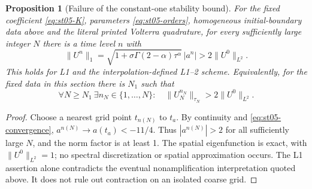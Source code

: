 \documentclass[11pt,a4paper]{amsart}
\theoremstyle{remark}
\theoremstyle{plain}
\newtheorem{proposition}{Proposition}[section]
\theoremstyle{remark}
\numberwithin{equation}{section}
\begin{document}
\begin{proposition}[Failure of the constant-one stability bound]\label{prop:st05}
For the fixed coefficient \eqref{eq:st05-K}, parameters \eqref{eq:st05-orders}, homogeneous initial-boundary data above and the literal printed Volterra quadrature, for every sufficiently large integer $N$ there is a time level $n$ with
\[
 \|U^n\|_1=\sqrt{1+\sigma\Gamma(2-\alpha)\tau^\alpha}\,|a^n|>2\|U^0\|_{L^2}.
\]
This holds for L1 and the interpolation-defined L1--2 scheme. Equivalently, for the fixed data in this section there is $N_1$ such that
\[
 \forall N\ge N_1\ \exists n_N\in\{1,\ldots,N\}:\quad
 \|U_N^{n_N}\|_{\tau_N}>2\|U^0\|_{L^2}.
\]
\end{proposition}
\begin{proof}
Choose a nearest grid point $t_{n(N)}$ to $t_a$. By continuity and \eqref{eq:st05-convergence}, $a^{n(N)}\to a(t_a)<-11/4$. Thus $|a^{n(N)}|>2$ for all sufficiently large $N$, and the norm factor is at least 1. The spatial eigenfunction is exact, with $\|U^0\|_{L^2}=1$; no spectral discretization or spatial approximation occurs. The L1 assertion alone contradicts the eventual nonamplification interpretation quoted above. It does not rule out contraction on an isolated coarse grid. \end{proof}
\end{document}
